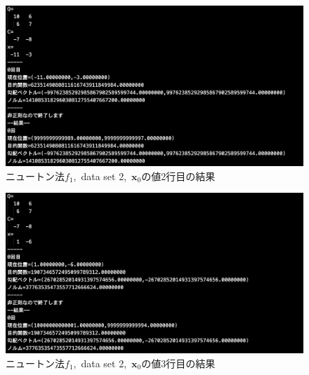 \documentclass[12pt]{jarticle}
\begin{document}
\begin{figure}[h]
    \begin{center}
        \includegraphics[scale=0.3]{kadai1_1n_out2_2_1.png}
    \end{center}
    \caption{ニュートン法$f_1$,\ data set 2,\ $\boldsymbol{x}_0$の値2行目の結果}
\end{figure}

\clearpage
\begin{figure}[h]
    \begin{center}
        \includegraphics[scale=0.2]{kadai1_1n_out2_3_1.png}
    \end{center}
    \caption{ニュートン法$f_1$,\ data set 2,\ $\boldsymbol{x}_0$の値3行目の結果}
\end{figure}
\end{document}
